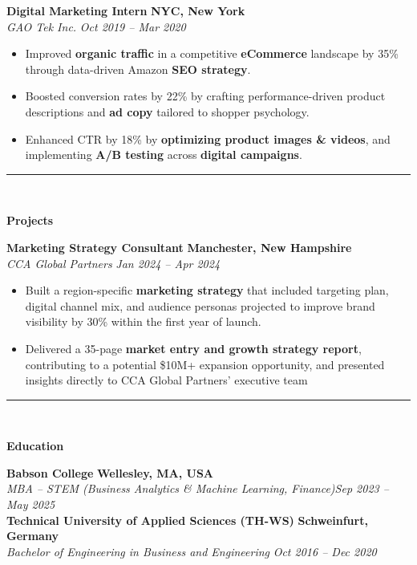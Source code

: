 \documentclass[10pt]{extarticle}
\newcommand{\sectiontitle}[1]{%
  \vspace{-4pt}
  \rule{\linewidth}{1.4pt}\\[-18pt]
  \begin{center}
    {\large \textbf{#1}}\\[-6pt]
  \end{center}
  \vspace{-5pt}
}
\newcommand{\job}[4]{%
  \textbf{#1} \hfill \textbf{#3}\\%
  \textit{#2} \hfill \textit{#4}\par%
  \vspace{-3pt}%
}
\begin{document}
\job{Digital Marketing Intern}
{GAO Tek Inc.}
{NYC, New York}
{Oct 2019 -- Mar 2020}
\begin{itemize}
  \item Improved \textbf{organic traffic} in a competitive \textbf{eCommerce} landscape by 35\% through data-driven Amazon \textbf{SEO strategy}.
  \item Boosted conversion rates by 22\% by crafting performance-driven product descriptions and \textbf{ad copy} tailored to shopper psychology.
  \item Enhanced CTR by 18\% by \textbf{optimizing product images \& videos}, and implementing \textbf{A/B testing} across \textbf{digital campaigns}.
\end{itemize}

\sectiontitle{Projects}

\job{Marketing Strategy Consultant}
{CCA Global Partners}
{Manchester, New Hampshire}
{Jan 2024 -- Apr 2024}
\begin{itemize}
  \item Built a region-specific \textbf{marketing strategy} that included targeting plan, digital channel mix, and audience personas projected to improve brand visibility by 30\% within the first year of launch.
  \item Delivered a 35-page \textbf{market entry and growth strategy report}, contributing to a potential \$10M+ expansion opportunity, and presented insights directly to CCA Global Partners' executive team
\end{itemize}

\sectiontitle{Education}

\textbf{Babson College} \hfill\textbf{Wellesley, MA, USA} \\
\textit{MBA -- STEM (Business Analytics \& Machine Learning, Finance)}\hfill\textit{Sep 2023 -- May 2025}\\[2pt]

\vspace{-12pt}
\textbf{Technical University of Applied Sciences (TH-WS)}  \hfill\textbf{Schweinfurt, Germany}\\
\textit{Bachelor of Engineering in Business and Engineering} \hfill\textit{Oct 2016 -- Dec 2020}\\
\end{document}
